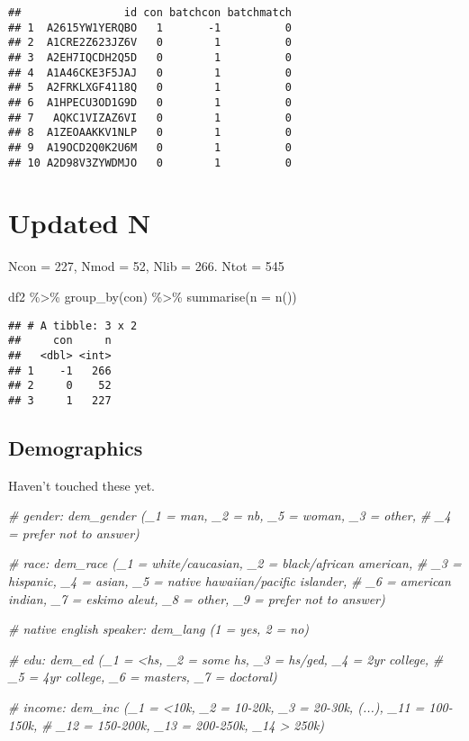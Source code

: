 \documentclass[
]{article}
\newenvironment{Shaded}{\begin{snugshade}}{\end{snugshade}}
\newcommand{\AttributeTok}[1]{\textcolor[rgb]{0.77,0.63,0.00}{#1}}
\newcommand{\CommentTok}[1]{\textcolor[rgb]{0.56,0.35,0.01}{\textit{#1}}}
\newcommand{\FunctionTok}[1]{\textcolor[rgb]{0.00,0.00,0.00}{#1}}
\newcommand{\NormalTok}[1]{#1}
\newcommand{\SpecialCharTok}[1]{\textcolor[rgb]{0.00,0.00,0.00}{#1}}
\begin{document}
\begin{verbatim}
##                id con batchcon batchmatch
## 1  A2615YW1YERQBO   1       -1          0
## 2  A1CRE2Z623JZ6V   0        1          0
## 3  A2EH7IQCDH2Q5D   0        1          0
## 4  A1A46CKE3F5JAJ   0        1          0
## 5  A2FRKLXGF4118Q   0        1          0
## 6  A1HPECU3OD1G9D   0        1          0
## 7   AQKC1VIZAZ6VI   0        1          0
## 8  A1ZEOAAKKV1NLP   0        1          0
## 9  A19OCD2Q0K2U6M   0        1          0
## 10 A2D98V3ZYWDMJO   0        1          0
\end{verbatim}

\hypertarget{updated-n}{%
\section{Updated N}\label{updated-n}}

Ncon = 227, Nmod = 52, Nlib = 266. Ntot = 545

\begin{Shaded}
\begin{Highlighting}[]
\NormalTok{df2 }\SpecialCharTok{\%\textgreater{}\%} 
  \FunctionTok{group\_by}\NormalTok{(con) }\SpecialCharTok{\%\textgreater{}\%} 
  \FunctionTok{summarise}\NormalTok{(}\AttributeTok{n =} \FunctionTok{n}\NormalTok{())}
\end{Highlighting}
\end{Shaded}

\begin{verbatim}
## # A tibble: 3 x 2
##     con     n
##   <dbl> <int>
## 1    -1   266
## 2     0    52
## 3     1   227
\end{verbatim}

\hypertarget{demographics}{%
\subsection{Demographics}\label{demographics}}

Haven't touched these yet.

\begin{Shaded}
\begin{Highlighting}[]
\CommentTok{\# gender: dem\_gender (\_1 = man, \_2 = nb, \_5 = woman, \_3 = other, }
\CommentTok{\# \_4 = prefer not to answer)}

\CommentTok{\# race: dem\_race (\_1 = white/caucasian, \_2 = black/african american,}
\CommentTok{\# \_3 = hispanic, \_4 = asian, \_5 = native hawaiian/pacific islander,}
\CommentTok{\# \_6 = american indian, \_7 = eskimo aleut, \_8 = other, \_9 = prefer not to answer)}

\CommentTok{\# native english speaker: dem\_lang (1 = yes, 2 = no)}

\CommentTok{\# edu: dem\_ed (\_1 = \textless{}hs, \_2 = some hs, \_3 = hs/ged, \_4 = 2yr college,}
\CommentTok{\# \_5 = 4yr college, \_6 = masters, \_7 = doctoral)}

\CommentTok{\# income: dem\_inc (\_1 = \textless{}10k, \_2 = 10{-}20k, \_3 = 20{-}30k, (...), \_11 = 100{-}150k,}
\CommentTok{\# \_12 = 150{-}200k, \_13 = 200{-}250k, \_14 \textgreater{} 250k)}
\end{Highlighting}
\end{Shaded}
\end{document}

